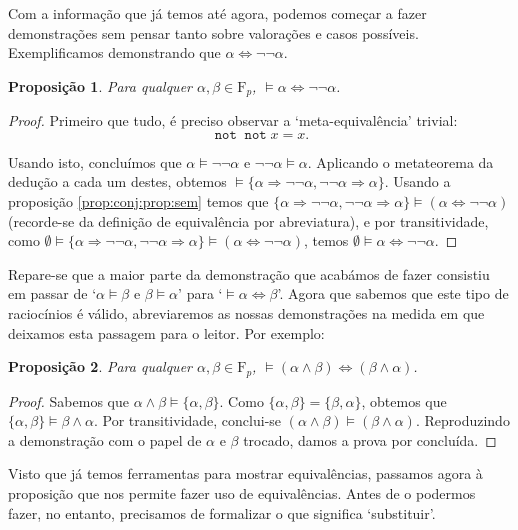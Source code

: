 \documentclass{report}
\newtheorem{prop}{Proposição}
\theoremstyle{definition}
\theoremstyle{remark}
\newcommand{\F}{\mathrm{F}}
\DeclareMathOperator{\pnot}{\texttt{not}}
\newcommand{\imply}{\mathbin{\Rightarrow}}
\newcommand{\eqv}{\mathbin{\Leftrightarrow}}
\begin{document}
	Com a informação que já temos até agora, podemos começar a fazer demonstrações sem pensar tanto sobre valorações e casos possíveis. Exemplificamos demonstrando que $\alpha \eqv \neg \neg \alpha$.
	
	\begin{prop}\label{alphaeqvnegnegalpha}
	Para qualquer $\alpha, \beta \in \F_p$, $\vDash \alpha \eqv \neg \neg \alpha$.
	\end{prop}
	
	\begin{proof}
	Primeiro que tudo, é preciso observar a `meta-equivalência' trivial:
	\[\pnot \pnot x = x.\]
	
	Usando isto, concluímos que $\alpha \vDash \neg \neg \alpha$ e $\neg \neg \alpha \vDash \alpha$. Aplicando o metateorema da dedução a cada um destes, obtemos $\vDash \{\alpha \imply \neg \neg \alpha, \neg \neg \alpha \imply \alpha\}$. Usando a proposição \ref{prop:conj:prop:sem}  temos que $\{\alpha \imply \neg \neg \alpha, \neg \neg \alpha \imply \alpha\} \vDash (\alpha \eqv \neg \neg \alpha)$ (recorde-se da definição de equivalência por abreviatura), e por transitividade, como $\emptyset \vDash \{\alpha \imply \neg \neg \alpha, \neg \neg \alpha \imply \alpha\} \vDash (\alpha \eqv \neg \neg \alpha)$, temos $\emptyset \vDash \alpha \eqv \neg \neg \alpha$.
	\end{proof}
	
	Repare-se que a maior parte da demonstração que acabámos de fazer consistiu em passar de `$\alpha \vDash \beta$ e $\beta \vDash \alpha$' para `$\vDash \alpha \eqv \beta$'. Agora que sabemos que este tipo de raciocínios é válido, abreviaremos as nossas demonstrações na medida em que deixamos esta passagem para o leitor. Por exemplo:
	
	\begin{prop}
	Para qualquer $\alpha, \beta \in \F_p$, $\vDash (\alpha \land \beta) \eqv (\beta \land \alpha)$.
	\end{prop}
	
	\begin{proof}
	Sabemos que $\alpha \land \beta \vDash \{\alpha, \beta\}$. Como $\{\alpha, \beta\} = \{\beta, \alpha\}$, obtemos que $\{\alpha, \beta\} \vDash \beta \land \alpha$. Por transitividade, conclui-se $(\alpha \land \beta) \vDash (\beta \land \alpha)$. Reproduzindo a demonstração com o papel de $\alpha$ e $\beta$ trocado, damos a prova por concluída.
	\end{proof}
	
	Visto que já temos ferramentas para mostrar equivalências, passamos agora à proposição que nos permite fazer uso de equivalências. Antes de o podermos fazer, no entanto, precisamos de formalizar o que significa `substituir'.
	
\end{document}
